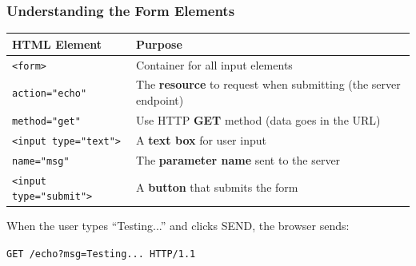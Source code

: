 \documentclass[xcolor=table]{beamer}
\begin{document}
\begin{frame}
\frametitle{Understanding the Form Elements}

\begingroup\small
\begin{center}
\begin{tabular}{|l|p{6cm}|}
\hline
\textbf{HTML Element} & \textbf{Purpose} \\
\hline
\texttt{<form>} & Container for all input elements \\
\hline
\texttt{action="echo"} & The \textbf{resource} to request when submitting (the server endpoint) \\
\hline
\texttt{method="get"} & Use HTTP \textbf{GET} method (data goes in the URL) \\
\hline
\texttt{<input type="text">} & A \textbf{text box} for user input \\
\hline
\texttt{name="msg"} & The \textbf{parameter name} sent to the server \\
\hline
\texttt{<input type="submit">} & A \textbf{button} that submits the form \\
\hline
\end{tabular}
\end{center}
\endgroup

\vspace{0.3cm}

When the user types ``Testing...'' and clicks SEND, the browser sends:

\vspace{0.1cm}

\begin{center}
\texttt{GET /echo?msg=Testing... HTTP/1.1}
\end{center}

\end{frame}
\end{document}
